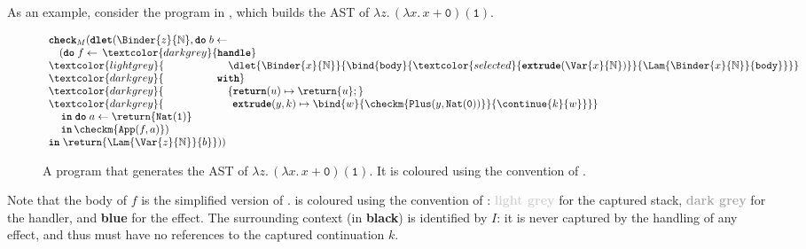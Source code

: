As an example, consider the program in , which builds the AST of $\lambda z. \, (\lambda x. \, x + \texttt{0}) (\texttt{1})$.
\begin{figure}
\[\begin{array}{l}
  \textbf{\texttt{check}}_M(\textbf{\texttt{dlet}}(\Binder{z}{\mathbb{N}}, \textbf{\texttt{do}} \; b \leftarrow \, \\ 
  \quad (\textbf{\texttt{do}} \; f \leftarrow \, \textcolor{darkgrey}{\textbf{\texttt{handle}}} \\
  \textcolor{lightgrey}{\;\;\;\,\quad \quad \quad\quad\quad {\dlet{\Binder{x}{\mathbb{N}}}{
  \bind{\texttt{body}}{\textcolor{selected}{\textbf{\texttt{extrude}}(\Var{x}{\mathbb{N}})}}{\Lam{\Binder{x}{\mathbb{N}}}{\texttt{body}}}}}} \\ 
  \textcolor{darkgrey}{\;\;\;\,\quad \quad\quad\quad \textbf{\texttt{with}}} \\ 
  \textcolor{darkgrey}{\;\;\;\,\quad \quad\quad\quad \quad \{ \textbf{\texttt{return}}(u) \mapsto {\return{u}};} \\ 
  \textcolor{darkgrey}{\;\;\;\, \quad \quad\quad\quad \quad \;\, \textbf{\texttt{extrude}}(y, k) \mapsto {\bind{w}{\checkm{\texttt{Plus}(y, \texttt{Nat}(\texttt{0}))}}{\continue{k}{w}}}\}} \\ 
  \, \quad \textbf{\texttt{in}} \; \textbf{\texttt{do}} \; {a}\leftarrow {\return{\texttt{Nat}(\texttt{1})}}\\
  \, \quad \textbf{\texttt{in}} \, {\checkm{\texttt{App}(f, a)}})\; \\
  \textbf{\texttt{in}} \; \return{\Lam{\Var{z}{\mathbb{N}}}{b}})) 
\end{array}\]
\caption{A \coreLang{} program that generates the AST of $\lambda z. \, (\lambda x. \, x + \texttt{0}) (\texttt{1})$. It is coloured using the convention of .}
\label{fig:core-unmute-example}
\end{figure}
Note that the body of $f$ is the simplified version of .  is coloured using the convention of : \textbf{\textcolor{lightgrey}{light grey}} for the captured stack, \textbf{\textcolor{darkgrey}{dark grey}} for the handler, and \textbf{\textcolor{selected}{blue}} for the effect. The surrounding context (in \textbf{black}) is identified by $I$: it is never captured by the handling of any effect, and thus must have no references to the captured continuation $k$.

